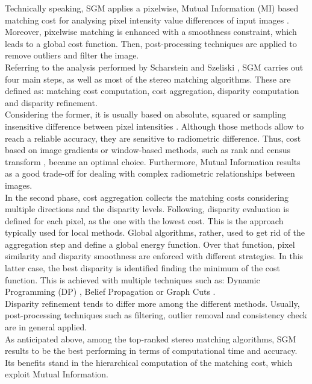 Technically speaking, SGM applies a pixelwise, Mutual Information (MI) based matching cost for analysing pixel intensity value differences of input images \citep{Hirschmuller2008}.
Moreover, pixelwise matching is enhanced with a smoothness constraint, which leads to a global cost function. 
Then, post-processing techniques are applied to remove outliers and filter the image.\\
Referring to the analysis performed by Scharstein and Szeliski \citep{Scharstein2001}, SGM carries out four main steps, as well as most of the stereo matching algorithms. 
These are defined as: matching cost computation, cost aggregation, disparity computation and disparity refinement. \\
Considering the former, it is usually based on absolute, squared or sampling insensitive difference between pixel intensities \citep{Hirschmuller2008}. Although those methods allow to reach a reliable accuracy, they are sensitive to radiometric difference. 
Thus, cost based on image gradients or window-based methods, such as rank and census transform \citep{Ko2017Ko2017}, became an optimal choice. 
Furthermore, Mutual Information results as a good trade-off for dealing with complex radiometric relationships between images.\\
In the second phase, cost aggregation collects the matching costs considering multiple directions and the disparity levels. 
Following, disparity evaluation is defined for each pixel, as the one with the lowest cost. This is the approach typically used for local methods. 
Global algorithms, rather, used to get rid of the aggregation step and define a global energy function. 
Over that function, pixel similarity and disparity smoothness are enforced with different strategies. In this latter case, the best disparity is identified finding the minimum of the cost function. This is achieved with multiple techniques such as: Dynamic Programming (DP) \citep{Birchfield1999}, Belief Propagation \citep{Klaus2006} or Graph Cuts \citep{Kolmogorov2001}.\\
Disparity refinement tends to differ more among the different methods. Usually, post-processing techniques such as filtering, outlier removal and consistency check are in general applied.\\
As anticipated above, among the top-ranked stereo matching algorithms, SGM results to be the best performing in terms of computational time and accuracy. 
Its benefits stand in the hierarchical computation of the matching cost, which exploit Mutual Information. 

